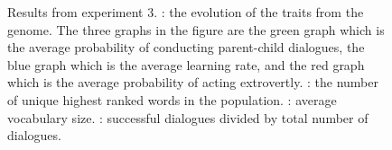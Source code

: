 \begin{figure}
    \centering
    \ContinuedFloat
    \hfill
    \par \bigskip
    \hfill
    \caption{Results from experiment 3. : the evolution of the traits from the genome. The three graphs in the figure are the green graph which is the average probability of conducting parent-child dialogues, the blue graph which is the average learning rate, and the  red graph which is the average probability of acting extrovertly. : the number of unique highest ranked words in the population. : average vocabulary size. : successful dialogues divided by total number of dialogues.}
    \label{fig:exp3.1}
\end{figure}
